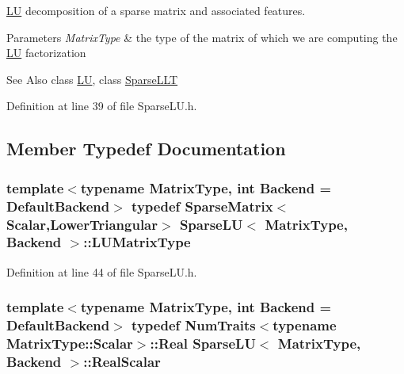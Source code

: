 \hyperlink{class_l_u}{L\-U} decomposition of a sparse matrix and associated features. 


\begin{DoxyParams}{Parameters}
{\em Matrix\-Type} & the type of the matrix of which we are computing the \hyperlink{class_l_u}{L\-U} factorization\\
\hline
\end{DoxyParams}
\begin{DoxySeeAlso}{See Also}
class \hyperlink{class_l_u}{L\-U}, class \hyperlink{class_sparse_l_l_t}{Sparse\-L\-L\-T} 
\end{DoxySeeAlso}


Definition at line 39 of file Sparse\-L\-U.\-h.



\subsection{Member Typedef Documentation}
\hypertarget{class_sparse_l_u_a2a00945644909dbf287e5d3bb3e71867}{
\subsubsection[{L\-U\-Matrix\-Type}]{\setlength{\rightskip}{0pt plus 5cm}template$<$typename Matrix\-Type, int Backend = Default\-Backend$>$ typedef {\bf Sparse\-Matrix}$<${\bf Scalar},{\bf Lower\-Triangular}$>$ {\bf Sparse\-L\-U}$<$ Matrix\-Type, Backend $>$\-::{\bf L\-U\-Matrix\-Type}\hspace{0.3cm}{\ttfamily [protected]}}}\label{class_sparse_l_u_a2a00945644909dbf287e5d3bb3e71867}


Definition at line 44 of file Sparse\-L\-U.\-h.

\hypertarget{class_sparse_l_u_a1090bc6ec27ebb0b088f6a1bf2ad6eab}{
\subsubsection[{Real\-Scalar}]{\setlength{\rightskip}{0pt plus 5cm}template$<$typename Matrix\-Type, int Backend = Default\-Backend$>$ typedef {\bf Num\-Traits}$<$typename Matrix\-Type\-::\-Scalar$>$\-::Real {\bf Sparse\-L\-U}$<$ Matrix\-Type, Backend $>$\-::{\bf Real\-Scalar}\hspace{0.3cm}{\ttfamily [protected]}}}\label{class_sparse_l_u_a1090bc6ec27ebb0b088f6a1bf2ad6eab}



